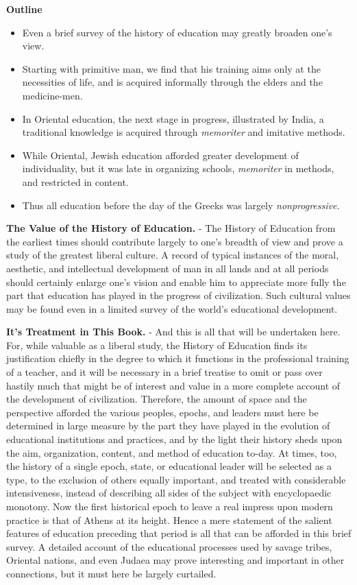 \documentclass[]{book}
\providecommand{\tightlist}{%
  \setlength{\itemsep}{0pt}\setlength{\parskip}{0pt}}
\begin{document}
\textbf{Outline}

\begin{itemize}
\tightlist
\item
  Even a brief survey of the history of education may greatly broaden one's view.
\item
  Starting with primitive man, we find that his training aims only at the necessities of life, and is acquired informally through the elders and the medicine-men.
\item
  In Oriental education, the next stage in progress, illustrated by India, a traditional knowledge is acquired through \emph{memoriter} and imitative methods.
\item
  While Oriental, Jewish education afforded greater development of individuality, but it was late in organizing schools, \emph{memoriter} in methods, and restricted in content.
\item
  Thus all education before the day of the Greeks was largely \emph{nonprogressive.}
\end{itemize}

\textbf{The Value of the History of Education.} - The History of Education from the earliest times should contribute largely to one's breadth of view and prove a study of the greatest liberal culture. A record of typical instances of the moral, aesthetic, and intellectual development of man in all lands and at all periods should certainly enlarge one's vision and enable him to appreciate more fully the part that education has played in the progress of civilization. Such cultural values may be found even in a limited survey of the world's educational development.

\textbf{It's Treatment in This Book.} - And this is all that will be undertaken here. For, while valuable as a liberal study, the History of Education finds its justification chiefly in the degree to which it functions in the professional training of a teacher, and it will be necessary in a brief treatise to omit or pass over hastily much that might be of interest and value in a more complete account of the development of civilization. Therefore, the amount of space and the perspective afforded the various peoples, epochs, and leaders must here be determined in large measure by the part they have played in the evolution of educational institutions and practices, and by the light their history sheds upon the aim, organization, content, and method of education to-day. At times, too, the history of a single epoch, state, or educational leader will be selected as a type, to the exclusion of others equally important, and treated with considerable intensiveness, instead of describing all sides of the subject with encyclopaedic monotony. Now the first historical epoch to leave a real impress upon modern practice is that of Athens at its height. Hence a mere statement of the salient features of education preceding that period is all that can be afforded in this brief survey. A detailed account of the educational processes used by savage tribes, Oriental nations, and even Judaea may prove interesting and important in other connections, but it must here be largely curtailed.
\end{document}
